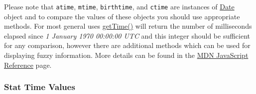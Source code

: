 \begin{Shaded}
\begin{Highlighting}[]
\NormalTok{\{ }\NormalTok{: }\NormalTok{,}
  \NormalTok{: }\NormalTok{,}
  \NormalTok{: }\NormalTok{,}
  \NormalTok{: }\NormalTok{,}
  \NormalTok{: }\NormalTok{,}
  \NormalTok{: }\NormalTok{,}
  \NormalTok{: }\NormalTok{,}
  \NormalTok{: }\NormalTok{,}
  \NormalTok{: }\NormalTok{,}
  \NormalTok{: }\NormalTok{,}
    \NormalTok{:}\NormalTok{:} 
    \NormalTok{:}\NormalTok{:} 
    \NormalTok{:}\NormalTok{:} 
    \NormalTok{:}\NormalTok{:} 
\end{Highlighting}
\end{Shaded}

Please note that \texttt{atime}, \texttt{mtime}, \texttt{birthtime}, and
\texttt{ctime} are instances of
\href{https://developer.mozilla.org/en/JavaScript/Reference/Global_Objects/Date}{Date}
object and to compare the values of these objects you should use
appropriate methods. For most general uses
\href{https://developer.mozilla.org/en/JavaScript/Reference/Global_Objects/Date/getTime}{getTime()}
will return the number of milliseconds elapsed since \emph{1 January
1970 00:00:00 UTC} and this integer should be sufficient for any
comparison, however there are additional methods which can be used for
displaying fuzzy information. More details can be found in the
\href{https://developer.mozilla.org/en/JavaScript/Reference/Global_Objects/Date}{MDN
JavaScript Reference} page.

\subsubsection{Stat Time Values}\label{stat-time-values}

